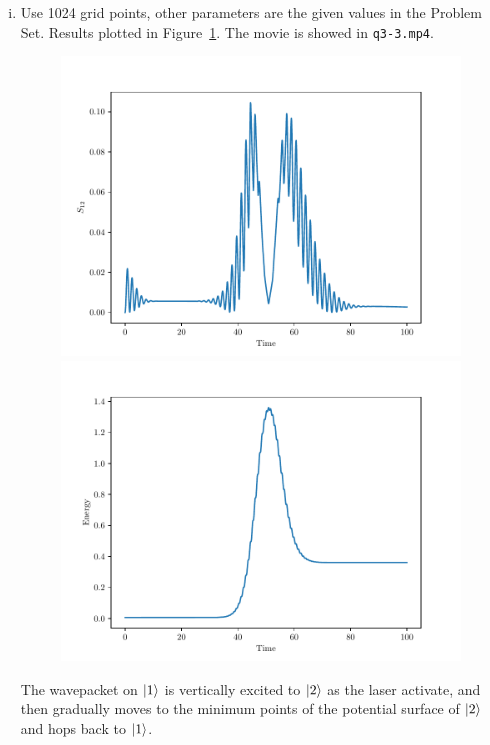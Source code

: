 \documentclass{article}
\begin{document}
\begin{enumerate}[1.]
\begin{enumerate}[(i)]
    \item Use 1024 grid points, other parameters are the given values in the Problem Set.
    Results plotted in Figure~\ref{fig:3-3}.
    The movie is showed in \texttt{q3-3.mp4}.
    \begin{figure}[H]
      \centering
      \begin{minipage}{0.48\linewidth}
        \centering
        \includegraphics[width=\linewidth]{q3-3_time_s12b.pdf}
      \end{minipage}
      \begin{minipage}{0.48\linewidth}
        \centering
        \includegraphics[width=\linewidth]{q3-3_time_energy.pdf}
      \end{minipage}
      \caption{}
      \label{fig:3-3}
    \end{figure}
    The wavepacket on $\ket{1}$ is vertically excited to $\ket{2}$ as the laser activate, and then gradually moves to the minimum points of the potential surface of $\ket{2}$ and hops back to $\ket{1}$.
  \end{enumerate}
\end{enumerate}
\end{document}
